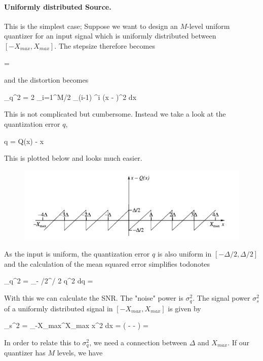 \paragraph{Uniformly distributed Source.} This is the simplest case; Suppose we want to design an $M$-level uniform quantizer for an input signal which is uniformly distributed between $[-X_{max}, X_{max}]$. The stepsize therefore becomes

\bee
\Delta = 
\eee

and the distortion becomes

\bee
\sigma_q^2 = 2 \sum_{i=1}^{M/2} \int_{(i-1) \Delta}^{i \Delta} \left(x -  \Delta \right)^2  dx
\eee

This is not complicated but cumbersome. Instead we take a look at the quantization error $q$,

\bee
q = Q(x) - x
\eee

This is plotted below and looks much easier.

\begin{figure}[H]
    \centering
    \includegraphics[scale=0.7]{images/2021-06-15-scalar_quant_02.png}
\end{figure}

As the input is uniform, the quantization error $q$ is also uniform in $[-\Delta/2, \Delta/2]$ and the calculation of the mean squared error simplifies todonotes

\bee
\sigma_q^2 =  \int_{- \Delta/2}^{\Delta / 2} q^2 dq = 
\eee

With this we can calculate the SNR. The "noise" power is $\sigma_q^2$. The signal power $\sigma_s^2$ of a uniformly distributed signal in $[-X_{max}, X_{max}]$ is given by

\bee
\sigma_s^2 =  \int_{-X_{max}}^{X_{max}} x^2 dx =  \left(  - -  \right) = 
\eee

In order to relate this to $\sigma_q^2$, we need a connection between $\Delta$ and $X_{max}$. If our quantizer has $M$ levels, we have

